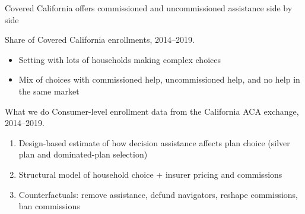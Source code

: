 \documentclass[aspectratio=169,11pt]{beamer}
\begin{document}
\begin{frame}{Covered California offers commissioned and uncommissioned assistance side by side}
  \begin{center}
  {\scriptsize\color{emoryMid} Share of Covered California enrollments, 2014--2019.}    
  \end{center}

  \vspace{0.3cm}
  \begin{itemize}
    \item<4-> Setting with lots of households making complex choices
    \item<5-> Mix of choices with commissioned help, uncommissioned help, and no help in the same market
  \end{itemize}
\end{frame}

\begin{frame}{What we do}
  Consumer-level enrollment data from the California ACA exchange, 2014--2019.

  \vspace{0.2cm}
  \begin{enumerate}
    \item<1-> Design-based estimate of how decision assistance affects plan choice (silver plan and dominated-plan selection)
    \item<2-> Structural model of household choice + insurer pricing and commissions
    \item<3-> Counterfactuals: remove assistance, defund navigators, reshape commissions, ban commissions
  \end{enumerate}
\end{frame}
\end{document}
